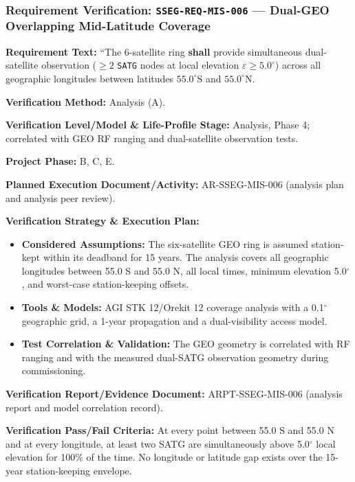 \subsubsection{Requirement Verification: \texttt{SSEG-REQ-MIS-006} --- Dual-GEO Overlapping Mid-Latitude Coverage}
\label{ver:SSEG-REQ-MIS-006}
\textbf{Requirement Text:} ``The 6-satellite  ring \textbf{shall} provide simultaneous dual-satellite observation ($\ge 2$ \texttt{SATG} nodes at local elevation $\varepsilon \ge 5.0^\circ$) across all geographic longitudes between latitudes $55.0^\circ\text{S}$ and $55.0^\circ\text{N}$.
\par\textbf{Verification Method:} Analysis (A).
\par\textbf{Verification Level/Model \& Life-Profile Stage:} Analysis, Phase 4; correlated with GEO RF ranging and dual-satellite observation tests.
\par\textbf{Project Phase:} B, C, E.
\par\textbf{Planned Execution Document/Activity:} AR-SSEG-MIS-006 (analysis plan and analysis peer review).
\par\textbf{Verification Strategy \& Execution Plan:}
\begin{itemize}
\item \textbf{Considered Assumptions:} The six-satellite GEO ring is assumed station-kept within its deadband for 15 years. The analysis covers all geographic longitudes between 55.0 S and 55.0 N, all local times, minimum elevation 5.0$^\circ$, and worst-case station-keeping offsets.
\item \textbf{Tools \& Models:} AGI STK 12/Orekit 12 coverage analysis with a 0.1$^\circ$ geographic grid, a 1-year propagation and a dual-visibility access model.
\item \textbf{Test Correlation \& Validation:} The GEO geometry is correlated with RF ranging and with the measured dual-SATG observation geometry during commissioning.
\end{itemize}
\par\textbf{Verification Report/Evidence Document:} ARPT-SSEG-MIS-006 (analysis report and model correlation record).
\par\textbf{Verification Pass/Fail Criteria:} At every point between 55.0 S and 55.0 N and at every longitude, at least two SATG are simultaneously above 5.0$^\circ$ local elevation for 100\% of the time. No longitude or latitude gap exists over the 15-year station-keeping envelope.
\par\medskip
